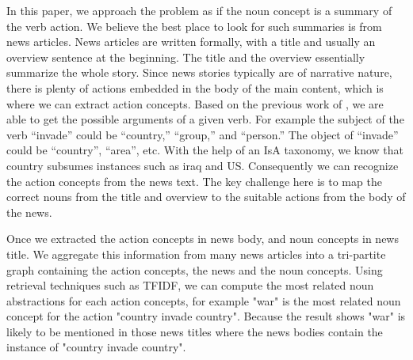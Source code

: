 %

In this paper, we approach the problem as if the noun concept is a
summary of the verb action. We believe the best place to look for 
such summaries is from news articles. News articles are written
formally, with a title and usually an overview sentence at the 
beginning. The title and the overview essentially summarize the whole
story. Since news stories typically are of narrative nature, there is
plenty of actions embedded in the body of the main content, which is
where we can extract action concepts. 
Based on the previous work of \cite{gong2015representing}, 
we are able to get the possible arguments of a given verb. 
For example the subject of the verb ``invade'' could
be ``country,'' ``group,'' and ``person.''  
The object of ``invade'' could be ``country'', ``area'', etc. 
With the help of an IsA taxonomy, we know that country subsumes
instances such as iraq and US. Consequently
we can recognize the action concepts from the news text.
The key challenge here is
to map the correct nouns from the title and overview to the suitable
actions from the body of the news.
 


Once we extracted the action concepts in news body, 
and noun concepts in news title. 
We aggregate this information from many news articles into
a tri-partite graph containing the action concepts,
the news and the noun concepts. Using retrieval techniques 
such as TFIDF, we can compute the most related noun abstractions
for each action concepts, for example "war" is the most related 
noun concept for the action "country invade country". Because the result shows "war" is likely to be mentioned in those
news titles where the news bodies contain the instance of "country invade country".

